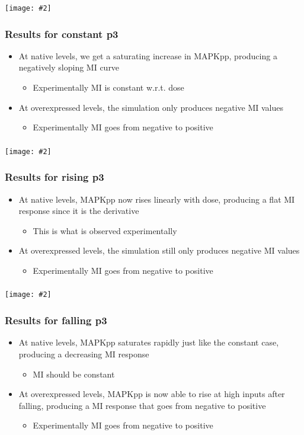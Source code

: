 \documentclass{beamer}
\newcommand{\plotslide}[2]{
  \begin{frame}
    \frametitle{#1}
    \centering
    \texttt{[image: \#2]}
  \end{frame}
}
\begin{document}
\plotslide{}{p3effects_Constant.pdf}
\begin{frame}
  \frametitle{Results for constant p3}
  \begin{itemize}
    \itemsep3em
    \item At native levels, we get a saturating increase in MAPKpp, producing
      a negatively sloping MI curve
      \begin{itemize}
          \item Experimentally MI is constant w.r.t. dose
      \end{itemize}
    \item At overexpressed levels, the simulation only produces negative MI
      values
      \begin{itemize}
          \item Experimentally MI goes from negative to positive
      \end{itemize}
  \end{itemize}
\end{frame}

\plotslide{}{p3effects_Rising.pdf}
\begin{frame}
  \frametitle{Results for rising p3}
  \begin{itemize}
    \itemsep3em
    \item At native levels, MAPKpp now rises linearly with dose, producing
      a flat MI response since it is the derivative
      \begin{itemize}
          \item This is what is observed experimentally
      \end{itemize}
    \item At overexpressed levels, the simulation still only produces negative MI
      values
      \begin{itemize}
          \item Experimentally MI goes from negative to positive
      \end{itemize}
  \end{itemize}
\end{frame}

\plotslide{}{p3effects_Falling.pdf}
\begin{frame}
  \frametitle{Results for falling p3}
  \begin{itemize}
    \itemsep3em
    \item At native levels, MAPKpp saturates rapidly just like the constant
      case, producing a decreasing MI response 
      \begin{itemize}
          \item MI should be constant
      \end{itemize}
    \item At overexpressed levels, MAPKpp is now able to rise at high inputs after
      falling, producing a MI response that goes from negative to positive
      \begin{itemize}
          \item Experimentally MI goes from negative to positive
      \end{itemize}
  \end{itemize}
\end{frame}
\end{document}
